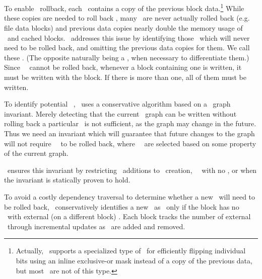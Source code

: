 \subsection{\Nrb\ \ChDescs}
\label{sec:chdescs:nrb}
To enable \chdesc\ rollback, each \chdesc\ contains a copy of the
previous block data.\footnote{Actually, \Kudos\ supports a specialized
type of \chdesc\ for efficiently flipping individual bits using an
inline exclusive-or mask instead of a copy of the previous data, but
most \chdescs\ are not of this type.}
%
While these copies are needed to roll back \chdescs, many
\chdescs\ are never actually rolled back (e.g. file data blocks) and
previous data copies nearly double the memory usage of \chdescs\ and
cached blocks.
%
\Kudos\ addresses this issue by identifying those \chdescs\ which will never
need to be rolled back, and omitting the previous data copies for them. We call
these \emph{\nrb} \chdescs. (The opposite naturally being a \emph{\rb} \chdesc,
when necessary to differentiate them.) Since \nrb\ \chdescs\ cannot be rolled
back, whenever a block containing one is written, it must be written with the
block. If there is more than one, all of them must be written.

To identify potential \nrb\ \chdescs, \Kudos\ uses a conservative algorithm
based on a \chdesc\ graph invariant. Merely detecting that the current
\chdesc\ graph can be written without rolling back a particular \chdesc\ is
not sufficient, as the graph may change in the future. Thus we need an
invariant which will guarantee that future changes to the graph will not
require \nrb\ \chdescs\ to be rolled back, where \nrb\ \chdescs\ are
selected based on some property of the current graph.

%
\Kudos\ ensures this invariant by restricting \before\ additions to
\chdesc\ creation, \noop\ \chdescs\ with no \afters, or when the invariant
is statically proven to hold.

To avoid a costly dependency traversal to determine whether a new
\chdesc\ will need to be rolled back, \Kudos\ conservatively identifies
a new \chdesc\ as \nrb\ only if the block has no \chdescs\
with external (on a different block\todo{Descriptive enough? Mention
\noop\ \chdesc\ \after\ recursion?}) \afters. Each block tracks the number of
external \afters\ through incremental updates as \afters\ are added and
removed.
